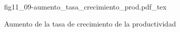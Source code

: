 \begin{figure}[h]
\centering
\def\svgwidth{0.5\textwidth}
{fig11_09-aumento_tasa_crecimiento_prod.pdf_tex}
\caption{Aumento de la tasa de crecimiento de la productividad}
\label{fig11_09-aumento_tasa_crecimiento_prod}
\end{figure}